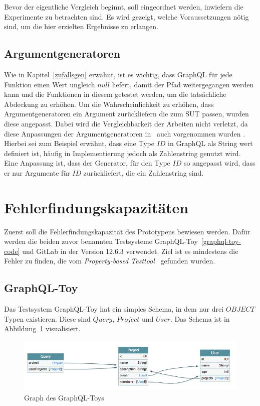 Bevor der eigentliche Vergleich beginnt, soll eingeordnet werden, inwiefern die Experimente zu betrachten sind.
Es wird gezeigt, welche Voraussetzungen nötig sind, um die hier erzielten Ergebnisse zu erlangen.

\subsection{Argumentgeneratoren}

Wie in Kapitel~\ref{zufallsgen} erwähnt, ist es wichtig, dass GraphQL für jede Funktion einen Wert ungleich $null$ liefert,
damit der Pfad weitergegangen werden kann und die Funktionen in diesem getestet werden, um die tatsächliche Abdeckung zu erhöhen.
Um die Wahrscheinlichkeit zu erhöhen, dass Argumentgeneratoren ein Argument zurückliefern die zum SUT passen, wurden diese angepasst.
Dabei wird die Vergleichbarkeit der Arbeiten nicht verletzt, da diese Anpassungen der Argumentgeneratoren in~\cite{property-based-testing} auch vorgenommen wurden \cite[vgl. Experimental Setup and Method]{property-based-testing}.
Hierbei sei zum Beispiel erwähnt, dass eine Type $ID$ in GraphQL als String wert definiert ist, häufig in Implementierung jedoch als Zahlenstring genutzt wird.
Eine Anpassung ist, dass der Generator, für den Type $ID$ so angepasst wird, dass er nur Argumente für $ID$ zurückliefert, die ein Zahlenstring sind.

\section{Fehlerfindungskapazitäten}

Zuerst soll die Fehlerfindungskapazität des Prototypens bewiesen werden.
Dafür werden die beiden zuvor benannten Testsysteme GraphQL-Toy~\ref{graphql-toy-code} und GitLab in der Version 12.6.3 verwendet.
Ziel ist es mindestens die Fehler zu finden, die vom \textit{Property-based Testtool}~\cite{property-based-testing} gefunden wurden.

\subsection{GraphQL-Toy}

Das Testsystem GraphQL-Toy hat ein simples Schema, in dem nur drei $OBJECT$ Typen existieren.
Diese sind $Query$, $Project$ und $User$.
Das Schema ist in Abbildung~\ref{gqltoysschm} visualisiert.
\begin{figure}
    \begin{center}
        \includegraphics[width=\textwidth,height=\textheight,keepaspectratio]{img/graphqltoy}
    \end{center}
    \caption{Graph des GraphQL-Toys}
    \label{gqltoysschm}
\end{figure}

